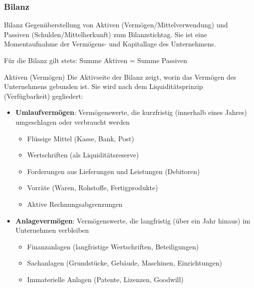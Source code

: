 \subsubsection{Bilanz}

\begin{definition}{Bilanz}
    Gegenüberstellung von Aktiven (Vermögen/Mittelverwendung) und Passiven (Schulden/Mittelherkunft) zum Bilanzstichtag. Sie ist eine Momentaufnahme der Vermögens- und Kapitallage des Unternehmens.

Für die Bilanz gilt stets: Summe Aktiven = Summe Passiven
\end{definition}

\begin{definition}{Aktiven (Vermögen)}
Die Aktivseite der Bilanz zeigt, worin das Vermögen des Unternehmens gebunden ist. Sie wird nach dem Liquiditätsprinzip (Verfügbarkeit) gegliedert:
\begin{itemize}
    \item \textbf{Umlaufvermögen}: Vermögenswerte, die kurzfristig (innerhalb eines Jahres) umgeschlagen oder verbraucht werden
    \begin{itemize}
        \item Flüssige Mittel (Kasse, Bank, Post)
        \item Wertschriften (als Liquiditätsreserve)
        \item Forderungen aus Lieferungen und Leistungen (Debitoren)
        \item Vorräte (Waren, Rohstoffe, Fertigprodukte)
        \item Aktive Rechnungsabgrenzungen
    \end{itemize}
    \item \textbf{Anlagevermögen}: Vermögenswerte, die langfristig (über ein Jahr hinaus) im Unternehmen verbleiben
    \begin{itemize}
        \item Finanzanlagen (langfristige Wertschriften, Beteiligungen)
        \item Sachanlagen (Grundstücke, Gebäude, Maschinen, Einrichtungen)
        \item Immaterielle Anlagen (Patente, Lizenzen, Goodwill)
    \end{itemize}
\end{itemize}
\end{definition}

